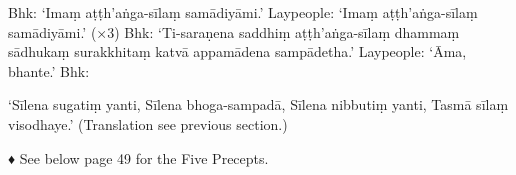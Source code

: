 Bhk: ‘Imaṃ aṭṭh’aṅga-sīlaṃ samādiyāmi.’
Laypeople: ‘Imaṃ aṭṭh’aṅga-sīlaṃ
samādiyāmi.’ (×3)
Bhk: ‘Ti-saraṇena saddhiṃ aṭṭh’aṅga-sīlaṃ
dhammaṃ sādhukaṃ surakkhitaṃ katvā
appamādena sampādetha.’
Laypeople: ‘Āma, bhante.’
Bhk:

‘Sīlena sugatiṃ yanti,
Sīlena bhoga-sampadā,
Sīlena nibbutiṃ yanti,
Tasmā sīlaṃ visodhaye.’
(Translation see previous section.)

♦ See below page 49 for the Five Precepts.

